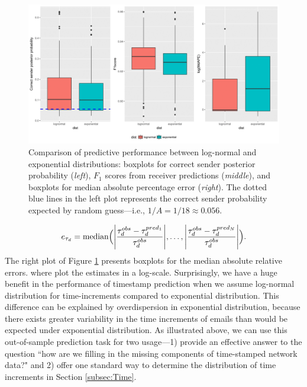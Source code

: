 \documentclass[ba]{imsart}
\numberwithin{equation}{section}
\theoremstyle{plain}
\DeclarePairedDelimiter\abs{\lvert}{\rvert}
\begin{document}
			\begin{figure}[!t]
				\centering
				\includegraphics[width=1\textwidth]{img/PPEplotnew-1.png}	
				\caption {Comparison of predictive performance between log-normal and exponential distributions: boxplots for correct sender posterior probability (\textit{left}), $F_1$ scores from receiver predictions (\textit{middle}), and boxplots for median absolute percentage error (\textit{right}). The dotted blue lines in the left plot represents the correct sender probability expected by random guess---i.e., $1/A=1/18\approx0.056$.}
				\label{figure:PPEresults}
			\end{figure}
		\begin{equation}
		e_{\tau_d} = \mbox{median}\Big(\abs*{\frac{\tau^{obs}_d - \tau^{pred_1}_{d}}{\tau^{obs}_d}},\ldots, \abs*{\frac{\tau^{obs}_d - \tau^{pred_N}_{d}}{\tau^{obs}_d}}\Big).
		\end{equation}
	The right plot of Figure \ref{figure:PPEresults} presents boxplots for the median absolute relative errors. where plot the estimates in a log-scale. Surprisingly, we have a huge benefit in the performance of timestamp prediction when we assume log-normal distribution for time-increments compared to exponential distribution. This difference can be explained by overdispersion in exponential distribution, because there exists greater variability in the time increments of emails than would be expected under exponential distribution. As illustrated above, we can use this out-of-sample prediction task for two usage---1) provide an effective answer to the question ``how are we filling in the missing components of time-stamped network data?" and 2) offer one standard way to determine the distribution of time increments in Section \ref{subsec:Time}. 
\end{document}
